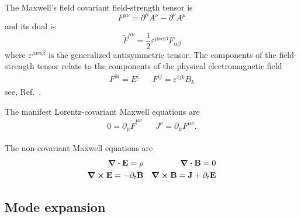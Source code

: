 \begin{definition}
	The Maxwell's field covariant field-strength tensor is
	\begin{equation}
		F^{\mu\nu}
		=
		\partial^\mu A^\nu
		-
		\partial^\nu A^\mu
	\end{equation}
	and its dual is
	\begin{equation}
		\tilde{F}^{\mu\nu}
		=
		\frac{1}{2}
		\varepsilon^{\mu\nu\alpha\beta}
		F_{\alpha\beta}
	\end{equation}
	where $\varepsilon^{\mu\nu\alpha\beta}$ is the generalized antisymmetric tensor.
	The components of the field-strength tensor relate to the components of the physical electromagnetic field
	\begin{align}
		F^{0i}
		=
		E^i
		&&
		F^{ij}
		=
		\varepsilon^{ijk}B_k
		\label{eq:mw_field_strength_components}
	\end{align}
	see, Ref.~\cite[p.~336]{Srednicki2007}.
\end{definition}
\begin{theorem}\label{thm:tensor_maxwell_equations}
	The manifest Lorentz-covariant Maxwell equations are
	\begin{align}
		0
		=
		\partial_\mu
		\tilde{F}^{\mu\nu}
		&&
		J^\nu
		=
		\partial_\mu
		F^{\mu\nu}
		.
	\end{align}
\end{theorem}
\begin{theorem}\label{thm:vector_maxwell_equations}
	The non-covariant Maxwell equations are
	\begin{align}
		\div\vb{E}
		=
		\rho
		&&
		\div\vb{B}
		=
		0
		\label{eq:mw_homo_vec}
		\\
		\curl\vb{E}
		=
		-
		\partial_t\vb{B}
		&&
		\curl\vb{B}
		=
		\vb{J}
		+
		\partial_t\vb{E}
		\label{eq:mw_inhomo_vec}
	\end{align}
\end{theorem}

\subsection{Mode expansion}

